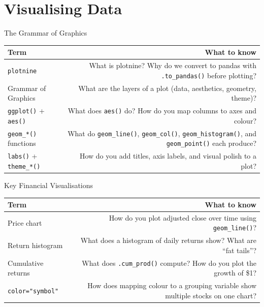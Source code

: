 \documentclass[9pt,aspectratio=169]{beamer}
\begin{document}
\section{Visualising Data}

\begin{frame}{The Grammar of Graphics}

\begin{tabular}{@{}lR@{}}
\toprule
\textbf{Term} & \textbf{What to know} \\
\midrule
\alert{\texttt{plotnine}} & What is plotnine? Why do we convert to pandas with \texttt{.to\_pandas()} before plotting? \\[0.8em]
\alert{Grammar of Graphics} & What are the layers of a plot (data, aesthetics, geometry, theme)? \\[0.8em]
\alert{\texttt{ggplot()} + \texttt{aes()}} & What does \texttt{aes()} do? How do you map columns to axes and colour? \\[0.8em]
\alert{\texttt{geom\_*()} functions} & What do \texttt{geom\_line()}, \texttt{geom\_col()}, \texttt{geom\_histogram()}, and \texttt{geom\_point()} each produce? \\[0.8em]
\alert{\texttt{labs()} + \texttt{theme\_*()}} & How do you add titles, axis labels, and visual polish to a plot? \\
\bottomrule
\end{tabular}

\end{frame}


\begin{frame}{Key Financial Visualisations}

\begin{tabular}{@{}lR@{}}
\toprule
\textbf{Term} & \textbf{What to know} \\
\midrule
\alert{Price chart} & How do you plot adjusted close over time using \texttt{geom\_line()}? \\[0.8em]
\alert{Return histogram} & What does a histogram of daily returns show? What are ``fat tails''? \\[0.8em]
\alert{Cumulative returns} & What does \texttt{.cum\_prod()} compute? How do you plot the growth of \$1? \\[0.8em]
\alert{\texttt{color="symbol"}} & How does mapping colour to a grouping variable show multiple stocks on one chart? \\
\bottomrule
\end{tabular}

\end{frame}
\end{document}
